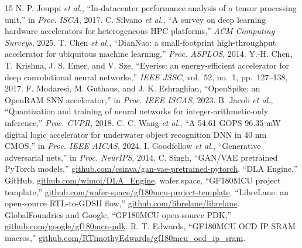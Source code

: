 \documentclass[conference,a4paper]{APSIPA2026}
\begin{document}
\begin{thebibliography}{15}
\setlength{\itemsep}{0pt}
 N. P. Jouppi \emph{et al.}, ``In-datacenter performance analysis of a tensor processing unit,'' in \emph{Proc. ISCA}, 2017.
 C. Silvano \emph{et al.}, ``A survey on deep learning hardware accelerators for heterogeneous HPC platforms,'' \emph{ACM Computing Surveys}, 2025.
 T. Chen \emph{et al.}, ``DianNao: a small-footprint high-throughput accelerator for ubiquitous machine learning,'' \emph{Proc. ASPLOS}, 2014.
 Y.-H. Chen, T. Krishna, J. S. Emer, and V. Sze, ``Eyeriss: an energy-efficient accelerator for deep convolutional neural networks,'' \emph{IEEE JSSC}, vol.~52, no.~1, pp.~127--138, 2017.
 F. Modaresi, M. Guthaus, and J. K. Eshraghian, ``OpenSpike: an OpenRAM SNN accelerator,'' in \emph{Proc. IEEE ISCAS}, 2023.
 B. Jacob \emph{et al.}, ``Quantization and training of neural networks for integer-arithmetic-only inference,'' \emph{Proc. CVPR}, 2018.
 C. C. Wang \emph{et al.}, ``A 54.61 GOPS 96.35 mW digital logic accelerator for underwater object recognition DNN in 40 nm CMOS,'' in \emph{Proc. IEEE AICAS}, 2024.
 I. Goodfellow \emph{et al.}, ``Generative adversarial nets,'' in \emph{Proc. NeurIPS}, 2014.
 C. Singh, ``GAN/VAE pretrained PyTorch models,'' \url{github.com/csinva/gan-vae-pretrained-pytorch}.
 ``DLA Engine,'' GitHub, \url{github.com/wlmoi/DLA_Engine}.
 wafer.space, ``GF180MCU project template,'' \url{github.com/wafer-space/gf180mcu-project-template}.
 ``LibreLane: an open-source RTL-to-GDSII flow,'' \url{github.com/librelane/librelane}.
 GlobalFoundries and Google, ``GF180MCU open-source PDK,'' \url{github.com/google/gf180mcu-pdk}.
 R. T. Edwards, ``GF180MCU OCD IP SRAM macros,'' \url{github.com/RTimothyEdwards/gf180mcu_ocd_ip_sram}.
\end{thebibliography}
\end{document}
